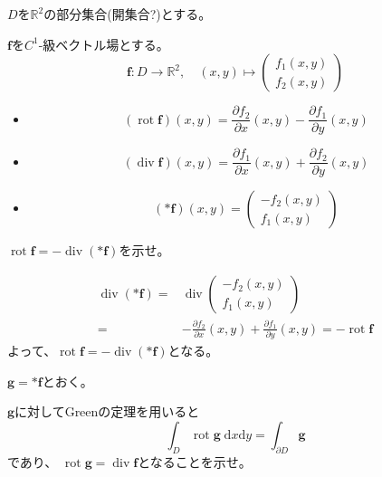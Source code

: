 \documentclass[12pt,b5paper]{ltjsarticle}
\newcommand{\Rot}{\mathop{\mathrm{rot}}\nolimits}
\newcommand{\Div}{\mathop{\mathrm{div}}\nolimits}
\begin{document}
\hrulefill

$D$を$\mathbb{R}^2$の部分集合(開集合?)とする。

$\bm{f}$を$C^1$-級ベクトル場とする。
\begin{equation}
 \bm{f}: D \to \mathbb{R}^2 , \quad (x,y) \mapsto \begin{pmatrix}f_1(x,y)\\f_2(x,y)\end{pmatrix}
\end{equation}

\begin{itemize}
 \item
      \begin{equation}
       (\Rot\bm{f})(x,y)
        = \frac{\partial f_2}{\partial x}(x,y) - \frac{\partial f_1}{\partial y}(x,y)
      \end{equation}
 \item
      \begin{equation}
       (\Div\bm{f})(x,y)
        =\frac{\partial f_1}{\partial x}(x,y) + \frac{\partial f_2}{\partial y}(x,y)
      \end{equation}
 \item
      \begin{equation}
       (*\bm{f})(x,y)
        = \begin{pmatrix}-f_2(x,y)\\f_1(x,y)\end{pmatrix}
      \end{equation}
\end{itemize}

\hrulefill

$\Rot\bm{f}=-\Div(*\bm{f})$を示せ。

\dotfill

\begin{align}
 \Div(*\bm{f}) =& \Div\begin{pmatrix}-f_2(x,y)\\f_1(x,y)\end{pmatrix}\\
 =& -\frac{\partial f_2}{\partial x}(x,y) + \frac{\partial f_1}{\partial y}(x,y)
 = -\Rot\bm{f}
\end{align}
よって、$\Rot\bm{f}=-\Div(*\bm{f})$となる。

\hrulefill

$\bm{g}=*\bm{f}$とおく。

$\bm{g}$に対してGreenの定理を用いると
\begin{equation}
 \int_{D}\Rot\bm{g}\;\mathrm{d}x\mathrm{d}y
  =\int_{\partial D}\bm{g}
\end{equation}
であり、
$\Rot\bm{g} = \Div\bm{f}$となることを示せ。
\end{document}
